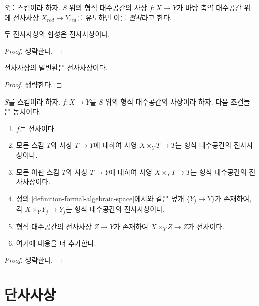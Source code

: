 \begin{definition}
\label{definition-surjective}
$S$를 스킴이라 하자. $S$ 위의 형식 대수공간의 사상
$f : X \to Y$가 바탕 축약 대수공간 위에 전사사상
$X_{red} \to Y_{red}$를 유도하면 이를 {\it 전사}라고 한다.
\end{definition}

\begin{lemma}
\label{lemma-composition-surjective}
두 전사사상의 합성은 전사사상이다.
\end{lemma}

\begin{proof}
생략한다.
\end{proof}

\begin{lemma}
\label{lemma-base-change-surjective}
전사사상의 밑변환은 전사사상이다.
\end{lemma}

\begin{proof}
생략한다.
\end{proof}

\begin{lemma}
\label{lemma-characterize-surjective}
$S$를 스킴이라 하자. $f : X \to Y$를 $S$ 위의 형식 대수공간의
사상이라 하자. 다음 조건들은 동치이다.
\begin{enumerate}
\item $f$는 전사이다.
\item 모든 스킴 $T$와 사상 $T \to Y$에 대하여 사영
$X \times_Y T \to T$는 형식 대수공간의 전사사상이다.
\item 모든 아핀 스킴 $T$와 사상 $T \to Y$에 대하여 사영
$X \times_Y T \to T$는 형식 대수공간의 전사사상이다.
\item 정의 \ref{definition-formal-algebraic-space}에서와 같은 덮개
$\{Y_j \to Y\}$가 존재하여, 각 $X \times_Y Y_j \to Y_j$는 형식
대수공간의 전사사상이다.
\item 형식 대수공간의 전사사상 $Z \to Y$가 존재하여
$X \times_Y Z \to Z$가 전사이다.
\item 여기에 내용을 더 추가한다. %
\end{enumerate}
\end{lemma}

\begin{proof}
생략한다.
\end{proof}

\section{단사사상}
\label{section-monomorphisms}

